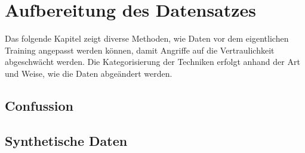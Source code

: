 \section{Aufbereitung des Datensatzes}

Das folgende Kapitel zeigt diverse Methoden, wie Daten vor dem eigentlichen Training angepasst werden können, damit Angriffe auf die Vertraulichkeit abgeschwächt werden.
Die Kategorisierung der Techniken erfolgt anhand der Art und Weise, wie die Daten abgeändert werden.



\subsection{Confussion}
\subsection{Synthetische Daten}